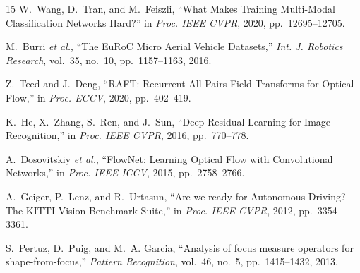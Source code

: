 \documentclass[conference]{IEEEtran}
\begin{document}
\begin{thebibliography}{15}
W.~Wang, D.~Tran, and M.~Feiszli, ``What Makes Training Multi-Modal Classification Networks Hard?'' in \textit{Proc. IEEE CVPR}, 2020, pp.~12695--12705.

M.~Burri \textit{et al.}, ``The EuRoC Micro Aerial Vehicle Datasets,'' \textit{Int. J. Robotics Research}, vol.~35, no.~10, pp.~1157--1163, 2016.

Z.~Teed and J.~Deng, ``RAFT: Recurrent All-Pairs Field Transforms for Optical Flow,'' in \textit{Proc. ECCV}, 2020, pp.~402--419.

K.~He, X.~Zhang, S.~Ren, and J.~Sun, ``Deep Residual Learning for Image Recognition,'' in \textit{Proc. IEEE CVPR}, 2016, pp.~770--778.

A.~Dosovitskiy \textit{et al.}, ``FlowNet: Learning Optical Flow with Convolutional Networks,'' in \textit{Proc. IEEE ICCV}, 2015, pp.~2758--2766.

A.~Geiger, P.~Lenz, and R.~Urtasun, ``Are we ready for Autonomous Driving? The KITTI Vision Benchmark Suite,'' in \textit{Proc. IEEE CVPR}, 2012, pp.~3354--3361.

S.~Pertuz, D.~Puig, and M.~A. Garcia, ``Analysis of focus measure operators for shape-from-focus,'' \textit{Pattern Recognition}, vol.~46, no.~5, pp.~1415--1432, 2013.

\end{thebibliography}
\end{document}
